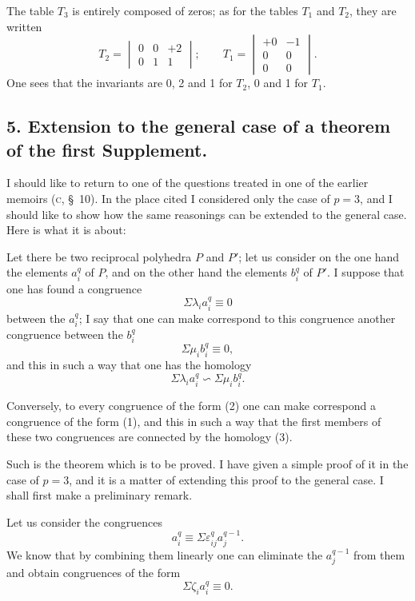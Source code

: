 \documentclass{article}
\begin{document}
The table $T_{3}$ is entirely composed of zeros; as for the tables $T_{1}$ and $T_{2}$, they are written
\[ T_{2} = \begin{vmatrix} 0 & 0 & +2 \\[1ex] 0 & 1 & 1 \end{vmatrix}; \qquad T_{1} = \begin{vmatrix} +0 & -1 \\[1ex] 0 & 0 \\[1ex] 0 & 0 \end{vmatrix}. \]
One sees that the invariants are 0, 2 and 1 for $T_{2}$, 0 and 1 for $T_{1}$.

\subsection*{5. Extension to the general case of a theorem of the first Supplement.}

I should like to return to one of the questions treated in one of the earlier memoirs (\textsc{c}, \S~10). In the place cited I considered only the case of $p = 3$, and I should like to show how the same reasonings can be extended to the general case. Here is what it is about:

Let there be two reciprocal polyhedra $P$ and $P'$; let us consider on the one hand the elements $a^{q}_{i}$ of $P$, and on the other hand the elements $b^{q}_{i}$ of $P'$. I suppose that one has found a congruence
\[ \Sigma \lambda_{i} a^{q}_{i} \equiv 0 \tag{1} \]
between the $a^{q}_{i}$; I say that one can make correspond to this congruence another congruence between the $b^{q}_{i}$
\[ \Sigma \mu_{i} b^{q}_{i} \equiv 0, \tag{2} \]
and this in such a way that one has the homology
\[ \Sigma \lambda_{i} a^{q}_{i} \backsim \Sigma \mu_{i} b^{q}_{i}. \tag{3} \]

Conversely, to every congruence of the form (2) one can make correspond a congruence of the form (1), and this in such a way that the first members of these two congruences are connected by the homology (3).

Such is the theorem which is to be proved. I have given a simple proof of it in the case of $p = 3$, and it is a matter of extending this proof to the general case. I shall first make a preliminary remark.

Let us consider the congruences
\[ a^{q}_{i} \equiv \Sigma \varepsilon^{q}_{ij} a^{q-1}_{j}. \tag{4} \]
We know that by combining them linearly one can eliminate the $a^{q-1}_{j}$ from them and obtain congruences of the form
\[ \Sigma \zeta_{i} a^{q}_{i} \equiv 0. \tag{5} \]
\end{document}
